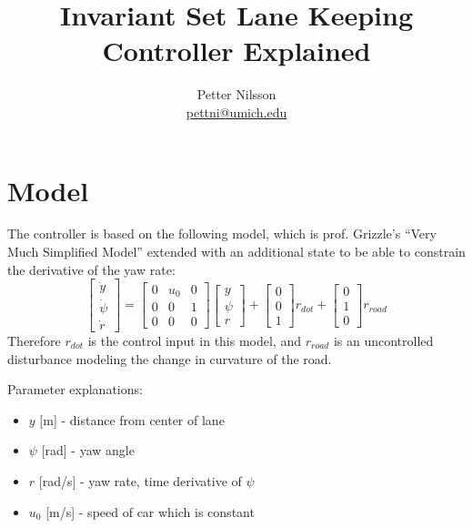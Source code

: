 \documentclass[letterpaper, 12pt]{article}
\title{Invariant Set Lane Keeping Controller Explained}
\author{Petter Nilsson \\ \href{mailto:pettni@umich.edu}{pettni@umich.edu}}
\begin{document}
\maketitle

\section{Model} %
\label{sec:model}

The controller is based on the following model, which is prof. Grizzle's ``Very Much Simplified Model'' extended with an additional state to be able to constrain the derivative of the yaw rate:
\begin{equation}
	\begin{bmatrix}
		\dot y \\
		\dot \psi \\ 
		\dot r
	\end{bmatrix} = 
	\begin{bmatrix}
		0 & u_0 & 0 \\
		0 & 0 & 1 \\
		0 & 0 & 0
	\end{bmatrix}
	\begin{bmatrix}
		y \\
		\psi \\ 
		r
	\end{bmatrix} + 
	\begin{bmatrix}
		0 \\ 0 \\ 1
	\end{bmatrix} r_{dot} + \begin{bmatrix}
		0 \\ 1 \\ 0
	\end{bmatrix} r_{road}
\end{equation}
Therefore $r_{dot}$ is the control input in this model, and $r_{road}$ is an uncontrolled disturbance modeling the change in curvature of the road.

Parameter explanations:
\begin{itemize}
	\item $y$ [m] - distance from center of lane
	\item $\psi$ [rad] - yaw angle
	\item $r$ [rad/s] - yaw rate, time derivative of $\psi$
	\item $u_0$ [m/s] - speed of car which is constant
\end{itemize}
\end{document}
